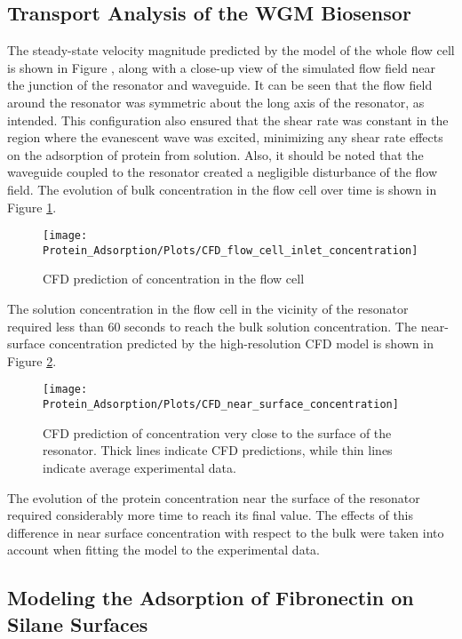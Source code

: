 \subsection{Transport Analysis of the WGM Biosensor}

The steady-state velocity magnitude predicted by the model of the
whole flow cell is shown in Figure , along with a close-up view of
the simulated flow field near the junction of the resonator and waveguide.
It can be seen that the flow field around the resonator was symmetric
about the long axis of the resonator, as intended. This configuration
also ensured that the shear rate was constant in the region where
the evanescent wave was excited, minimizing any shear rate effects
on the adsorption of protein from solution. Also, it should be noted
that the waveguide coupled to the resonator created a negligible disturbance
of the flow field. The evolution of bulk concentration in the flow
cell over time is shown in Figure \ref{fig:CFD Bulk Conc}.%
\begin{figure}
\texttt{[image: Protein\_Adsorption/Plots/CFD\_flow\_cell\_inlet\_concentration]}

\caption{\label{fig:CFD Bulk Conc}CFD prediction of concentration in the flow
cell}


%
\end{figure}
 The solution concentration in the flow cell in the vicinity of the
resonator required less than 60 seconds to reach the bulk solution
concentration. The near-surface concentration predicted by the high-resolution
CFD model is shown in Figure \ref{fig:CFD near surface conc}.%
\begin{figure}
\texttt{[image: Protein\_Adsorption/Plots/CFD\_near\_surface\_concentration]}

\caption{\label{fig:CFD near surface conc}CFD prediction of concentration
very close to the surface of the resonator. Thick lines indicate CFD
predictions, while thin lines indicate average experimental data.}


%
\end{figure}
 The evolution of the protein concentration near the surface of the
resonator required considerably more time to reach its final value.
The effects of this difference in near surface concentration with
respect to the bulk were taken into account when fitting the model
to the experimental data.


\subsection{Modeling the Adsorption of Fibronectin on Silane Surfaces}

